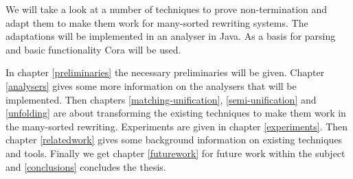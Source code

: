 We will take a look at a number of techniques to prove non-termination and adapt them to make them work for many-sorted rewriting systems. The adaptations will be implemented in an analyser in Java. As a basis for parsing and basic functionality Cora will be used. 

In chapter \ref{preliminaries} the necessary preliminaries will be given. Chapter \ref{analysers} gives some more information on the analysers that will be implemented. Then chapters \ref{matching-unification}, \ref{semi-unification} and \ref{unfolding} are about transforming the existing techniques to make them work in the many-sorted rewriting. Experiments are given in chapter \ref{experiments}. Then chapter \ref{relatedwork} gives some background information on existing techniques and tools. Finally we get chapter \ref{futurework} for future work within the subject and \ref{conclusions} concludes the thesis. 